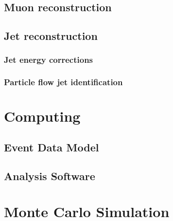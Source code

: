 \subsection{Muon reconstruction}

\subsection{Jet reconstruction}

\subsubsection{Jet energy corrections}

\subsubsection{Particle flow jet identification}

\section{Computing}

\subsection{Event Data Model}

\subsection{Analysis Software}

\section{Monte Carlo Simulation}

